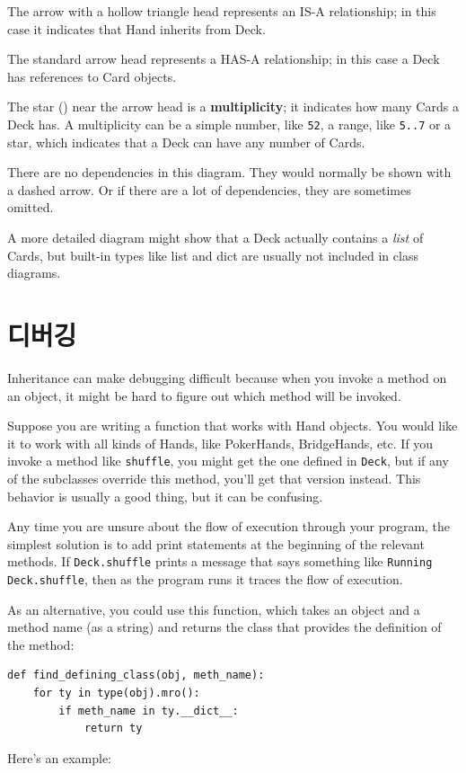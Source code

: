 \documentclass[10pt]{book}
\begin{document}
The arrow with a hollow triangle head represents an IS-A
relationship; in this case it indicates that Hand inherits
from Deck.

The standard arrow head represents a HAS-A
relationship; in this case a Deck has references to Card
objects.

The star ({\tt *}) near the arrow head is a 
{\bf multiplicity}; it indicates how many Cards a Deck has.
A multiplicity can be a simple number, like {\tt 52}, a range,
like {\tt 5..7} or a star, which indicates that a Deck can
have any number of Cards.

There are no dependencies in this diagram.  They would normally
be shown with a dashed arrow.  Or if there are a lot of
dependencies, they are sometimes omitted.

A more detailed diagram might show that a Deck actually
contains a {\em list} of Cards, but built-in types
like list and dict are usually not included in class diagrams.


\section{디버깅}

Inheritance can make debugging difficult because when you invoke a
method on an object, it might be hard to figure out which method will
be invoked.  

Suppose you are writing a function that works with Hand objects.
You would like it to work with all kinds of Hands, like
PokerHands, BridgeHands, etc.  If you invoke a method like
{\tt shuffle}, you might get the one defined in {\tt Deck},
but if any of the subclasses override this method, you'll
get that version instead.  This behavior is usually a good
thing, but it can be confusing.

Any time you are unsure about the flow of execution through your
program, the simplest solution is to add print statements at the
beginning of the relevant methods.  If {\tt Deck.shuffle} prints a
message that says something like {\tt Running Deck.shuffle}, then as
the program runs it traces the flow of execution.

As an alternative, you could use this function, which takes an
object and a method name (as a string) and returns the class that
provides the definition of the method:

\begin{verbatim}
def find_defining_class(obj, meth_name):
    for ty in type(obj).mro():
        if meth_name in ty.__dict__:
            return ty
\end{verbatim}
%
Here's an example:
\end{document}
